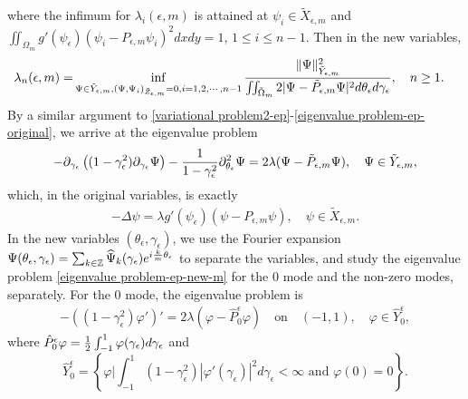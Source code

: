 \documentclass[1 [leqno, 11pt]{amsart}
\numberwithin{equation}{section}
\let\ep=\epsilon
\let\pa=\partial
\begin{document}
\begin{CJK*}{GBK}{song}
where the  infimum for $\lambda_i(\ep,m)$ is attained at $\psi_{i} \in \tilde X_{\ep,m}$ and $\iint_{\Omega_m} g'(\psi_\ep)(\psi_{i} - {P_{\ep,m}}\psi_{i})^2 dxdy = 1$, $1\leq i \leq n-1$.
Then in the new variables,
\begin{align}\label{variational problem2-ep-m-new variables}
\lambda_n(\ep,m)
=&\inf_{\Psi \in \tilde Y_{\ep,m}, (\Psi, \Psi_{i})_{\tilde Z_{\ep,m}} = 0, i = 1, 2, \cdots, n-1}{\|\Psi\|_{\tilde{Y}_{\ep,m}}^2\over\iint_{\tilde \Omega_{m}}2|\Psi-\tilde P_{\ep,m}\Psi|^2d\theta_\ep d\gamma_\ep},\quad
n\geq1.
\end{align}
By a similar argument to \eqref{variational problem2-ep}-\eqref{eigenvalue problem-ep-original},  we arrive at the eigenvalue problem
\begin{align}\label{eigenvalue problem-ep-new-m}
-\pa_{\gamma_\ep}\left((1-\gamma_\ep^2)\pa_{\gamma_\ep}\Psi\right)-{1\over1-\gamma_\ep^2}\pa_{\theta_\ep}^2\Psi
=2\lambda(\Psi-\tilde P_{\ep,m}\Psi), \quad \Psi \in \tilde{Y}_{\ep,m},
\end{align}
which, in the original variables, is exactly
\begin{align}\label{eigenvalue problem-ep-original-m}
-\Delta \psi = \lambda g'(\psi_\ep)(\psi -  P_{\ep,m}\psi), \quad \psi \in \tilde{X}_{\ep,m}.
\end{align}
In the new variables $(\theta_\ep,\gamma_\ep)$, we use the Fourier expansion $\Psi(\theta_\ep,\gamma_\ep)=\sum_{k\in\mathbb{Z}}\widehat{\Psi}_{k}(\gamma_\ep)e^{i{k\over m} \theta_\ep}$ to separate the variables, and study the eigenvalue problem \eqref{eigenvalue problem-ep-new-m} for the $0$ mode and the non-zero modes, separately.  For the $0$ mode,
the eigenvalue problem  is
\begin{align}\label{eigenvalue problem for 0 mode-m}
-\left((1-\gamma_\ep^2)  \varphi'\right)' = 2 \lambda(\varphi-\hat{P}_{0}^\ep\varphi) \quad \text{on}\quad (-1,1),\quad\varphi\in \hat Y_{0}^\ep,
\end{align}
where $\hat{P}_{0}^\ep\varphi={1\over2}\int_{-1}^{1}\varphi(\gamma_\ep)d\gamma_\ep$  and
\begin{equation*}
\hat Y_0^\ep=\left\{\varphi\bigg|\int_{-1}^1(1-\gamma_\ep^2)|\varphi'(\gamma_\ep)|^2d\gamma_\ep<\infty\text{ and }\varphi(0)=0 \right\}.
\end{equation*}

\end{CJK*}
\end{document}
